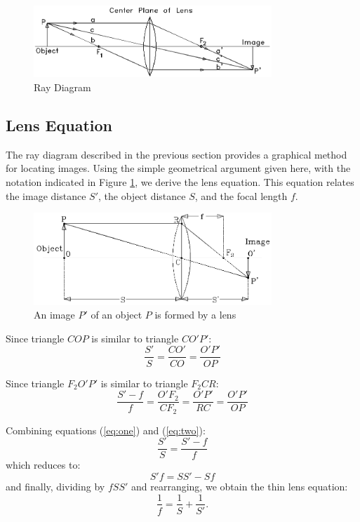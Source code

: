 \begin{figure}[h]
\centering
\includegraphics[width=0.8\textwidth]{./Exp6/pic/image3.png}
\caption{Ray Diagram}
\end{figure}

\subsection{Lens Equation}
\label{sec:lens}
The ray diagram described in the previous section provides a graphical method for locating images. Using the simple geometrical argument given here, with the notation indicated in Figure \ref{fig:lenseq}, we derive the lens equation. This equation relates the image distance $S'$, the object distance $S$, and the focal length $f$.
\begin{figure}[h]
\centering
\includegraphics[width=0.8\textwidth]{./Exp6/pic/image4.png}
\caption{An image $P'$ of an object $P$ is formed by a lens}
\label{fig:lenseq}
\end{figure}

Since triangle $COP$ is similar to triangle $CO'P'$:
\begin{equation}
  \frac{S'}{S}=\frac{CO'}{CO}=\frac{O'P'}{OP}
  \label{eq:one}
\end{equation}

Since triangle $F_2O'P'$ is similar to triangle $F_2CR$:
\begin{equation}
  \label{eq:two}
  \frac{S'-f}{f}=\frac{O'F_{2}}{CF_{2}}=\frac{O'P'}{RC}=\frac{O'P'}{OP}
\end{equation}

Combining equations ({\ref{eq:one}}) and ({\ref{eq:two}}):
\begin{equation}
  \frac{S'}{S}=\frac{S'-f}{f}
\end{equation}
which reduces to:
\begin{equation}
  S'f=SS'-Sf
\end{equation}
and finally, dividing by $fSS'$ and rearranging, we obtain the thin lens equation:
\begin{equation}
  \frac{1}{f}=\frac{1}{S}+\frac{1}{S'}.
\end{equation}

